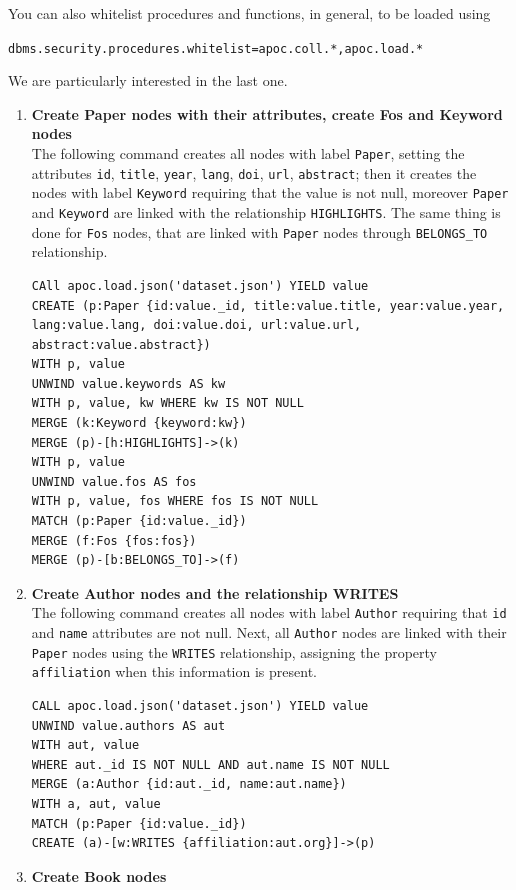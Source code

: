 You can also whitelist procedures and functions, in general, to be loaded using
\begin{center}
    \verb|dbms.security.procedures.whitelist=apoc.coll.*,apoc.load.*|
\end{center}
We are particularly interested in the last one.
\begin{enumerate}
    \item\textbf{Create Paper nodes with their attributes, create Fos and Keyword nodes} \\
    The following command creates all nodes with label \verb|Paper|, setting the attributes \verb|id|, \verb|title|, \verb|year|, \verb|lang|, \verb|doi|, \verb|url|, \verb|abstract|; then it creates the nodes with label \verb|Keyword| requiring that the value is not null, moreover \verb|Paper| and \verb|Keyword| are linked with the relationship \verb|HIGHLIGHTS|.
    The same thing is done for \verb|Fos| nodes, that are linked with \verb|Paper| nodes through \verb|BELONGS_TO| relationship.
    \begin{lstlisting}[label={lst:upload_process2}]
CAll apoc.load.json('dataset.json') YIELD value
CREATE (p:Paper {id:value._id, title:value.title, year:value.year, lang:value.lang, doi:value.doi, url:value.url, abstract:value.abstract})
WITH p, value
UNWIND value.keywords AS kw
WITH p, value, kw WHERE kw IS NOT NULL
MERGE (k:Keyword {keyword:kw})
MERGE (p)-[h:HIGHLIGHTS]->(k)
WITH p, value
UNWIND value.fos AS fos
WITH p, value, fos WHERE fos IS NOT NULL
MATCH (p:Paper {id:value._id})
MERGE (f:Fos {fos:fos})
MERGE (p)-[b:BELONGS_TO]->(f)
    \end{lstlisting}
    \item \textbf{Create Author nodes and the relationship WRITES} \\
    The following command creates all nodes with label \verb|Author| requiring that \verb|id| and \verb|name| attributes are not null.
    Next, all \verb|Author| nodes are linked with their \verb|Paper| nodes using the \verb|WRITES| relationship, assigning the property \verb|affiliation| when this information is present.
    \begin{lstlisting}[label={lst:author_writes}]
CALL apoc.load.json('dataset.json') YIELD value
UNWIND value.authors AS aut
WITH aut, value
WHERE aut._id IS NOT NULL AND aut.name IS NOT NULL
MERGE (a:Author {id:aut._id, name:aut.name})
WITH a, aut, value
MATCH (p:Paper {id:value._id})
CREATE (a)-[w:WRITES {affiliation:aut.org}]->(p)
    \end{lstlisting}
    \item \textbf{Create Book nodes} \\

\end{enumerate}
